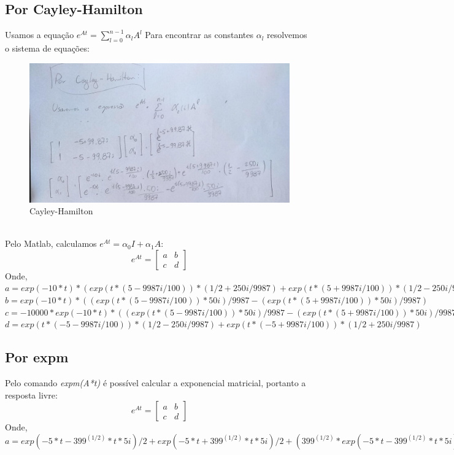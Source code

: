 \documentclass[a4paper, 12pt]{article}
\begin{document}
	\subsection{Por Cayley-Hamilton}
		Usamos a equação $e^{At} = \sum^{n-1}_{l = 0} \alpha_lA^l$
		Para encontrar as constantes $\alpha_l$ resolvemos o sistema de equações:
		\begin{figure}[h]
			\centering
			\includegraphics[scale=0.3]{imagens/a4.jpg}
			\caption{Cayley-Hamilton}
		\end{figure}\\
		Pelo Matlab, calculamos $e^{At} = \alpha_0I + \alpha_1A$:
		\begin{equation}
			e^{At} = \begin{bmatrix}
				a & b\\
				c & d
			\end{bmatrix}
		\end{equation}
		Onde,\\
		$a = exp(-10*t)*(exp(t*(5 - 9987i/100))*(1/2 + 250i/9987) + exp(t*(5 + 9987i/100))*(1/2 - 250i/9987))$\\
		
		$b = exp(-10*t)*((exp(t*(5 - 9987i/100))*50i)/9987 - (exp(t*(5 + 9987i/100))*50i)/9987)$\\
		
		$c = -10000*exp(-10*t)*((exp(t*(5 - 9987i/100))*50i)/9987 - (exp(t*(5 + 9987i/100))*50i)/9987)$\\
		
		$d = exp(t*(- 5 - 9987i/100))*(1/2 - 250i/9987) + exp(t*(- 5 + 9987i/100))*(1/2 + 250i/9987)$

	\subsection{Por expm}
		Pelo comando \textit{expm(A*t)} é possível calcular a exponencial matricial, portanto a resposta livre:
		\begin{equation}
			e^{At} = \begin{bmatrix}
				a & b\\
				c & d
			\end{bmatrix}
		\end{equation}
		Onde,\\
		$a = exp(- 5*t - 399^{(1/2)}*t*5i)/2 + exp(- 5*t + 399^{(1/2)}*t*5i)/2 + (399^{(1/2)}*exp(- 5*t - 399^{(1/2)}*t*5i)*1i)/798 - (399^{(1/2)}*exp(- 5*t + 399^{(1/2)}*t*5i)*1i)/798$\\
		
\end{document}
